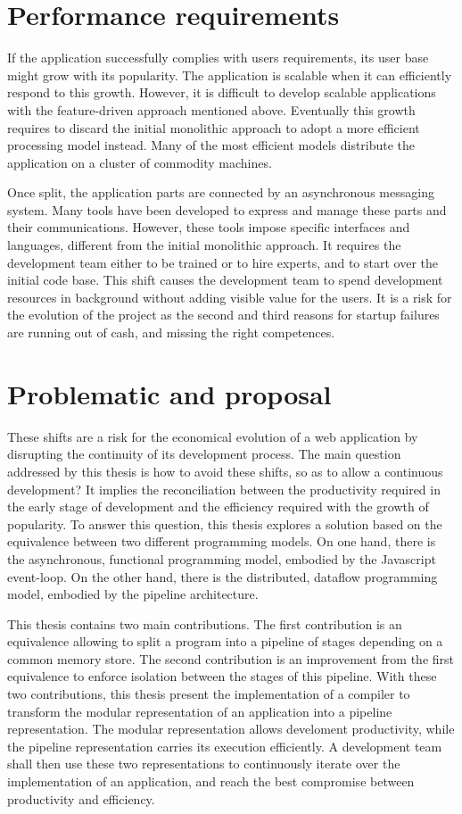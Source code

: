\section{Performance requirements}

If the application successfully complies with users requirements, its user base might grow with its popularity.
The application is scalable when it can efficiently respond to this growth.
However, it is difficult to develop scalable applications with the feature-driven approach mentioned above.
Eventually this growth requires to discard the initial monolithic approach to adopt a more efficient processing model instead.
Many of the most efficient models distribute the application on a cluster of commodity machines.

Once split, the application parts are connected by an asynchronous messaging system.
Many tools have been developed to express and manage these parts and their communications.
However, these tools impose specific interfaces and languages, different from the initial monolithic approach.
It requires the development team either to be trained or to hire experts, and to start over the initial code base.
This shift causes the development team to spend development resources in background without adding visible value for the users.
It is a risk for the evolution of the project as the second and third reasons for startup failures are running out of cash, and missing the right competences.

\section{Problematic and proposal}

These shifts are a risk for the economical evolution of a web application by disrupting the continuity of its development process.
The main question addressed by this thesis is how to avoid these shifts, so as to allow a continuous development?
It implies the reconciliation between the productivity required in the early stage of development and the efficiency required with the growth of popularity.
To answer this question, this thesis explores a solution based on the equivalence between two different programming models.
On one hand, there is the asynchronous, functional programming model, embodied by the Javascript event-loop.
On the other hand, there is the distributed, dataflow programming model, embodied by the pipeline architecture.

This thesis contains two main contributions.
The first contribution is an equivalence allowing to split a program into a pipeline of stages depending on a common memory store.
The second contribution is an improvement from the first equivalence to enforce isolation between the stages of this pipeline.
With these two contributions, this thesis present the implementation of a compiler to transform the modular representation of an application into a pipeline representation.
The modular representation allows develoment productivity, while the pipeline representation carries its execution efficiently.
A development team shall then use these two representations to continuously iterate over the implementation of an application, and reach the best compromise between productivity and efficiency.

